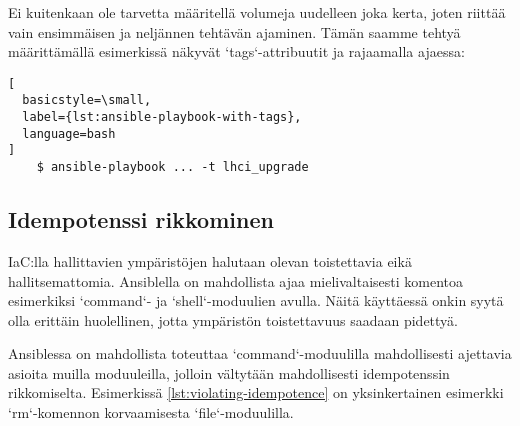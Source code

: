 

Ei kuitenkaan ole tarvetta määritellä volumeja uudelleen joka kerta, joten riittää vain
ensimmäisen ja neljännen tehtävän ajaminen. Tämän saamme tehtyä määrittämällä esimerkissä
näkyvät `tags`-attribuutit ja rajaamalla ajaessa:

\begin{lstlisting}[
  basicstyle=\small,
  label={lst:ansible-playbook-with-tags},
  language=bash
]
    $ ansible-playbook ... -t lhci_upgrade
\end{lstlisting}

\subsection{Idempotenssi rikkominen}

IaC:lla hallittavien ympäristöjen halutaan olevan toistettavia eikä hallitsemattomia.
Ansiblella on mahdollista ajaa mielivaltaisesti komentoa esimerkiksi `command`- ja
`shell`-moduulien avulla. Näitä käyttäessä onkin syytä olla erittäin huolellinen,
jotta ympäristön toistettavuus saadaan pidettyä. \parencite{KumaraIndika2021Tdad}

Ansiblessa on mahdollista toteuttaa `command`-moduulilla mahdollisesti ajettavia
asioita muilla moduuleilla, jolloin vältytään mahdollisesti idempotenssin rikkomiselta.
Esimerkissä \ref{lst:violating-idempotence} on yksinkertainen esimerkki `rm`-komennon
korvaamisesta `file`-moduulilla.


